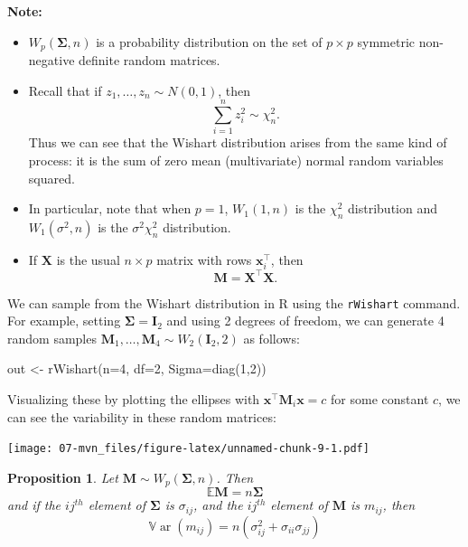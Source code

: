 \documentclass[
]{book}
\newenvironment{Shaded}{\begin{snugshade}}{\end{snugshade}}
\newcommand{\AttributeTok}[1]{\textcolor[rgb]{0.77,0.63,0.00}{#1}}
\newcommand{\DecValTok}[1]{\textcolor[rgb]{0.00,0.00,0.81}{#1}}
\newcommand{\FunctionTok}[1]{\textcolor[rgb]{0.00,0.00,0.00}{#1}}
\newcommand{\NormalTok}[1]{#1}
\newcommand{\OtherTok}[1]{\textcolor[rgb]{0.56,0.35,0.01}{#1}}
\newtheorem{proposition}{Proposition}[chapter]
\theoremstyle{definition}
\theoremstyle{definition}
\theoremstyle{definition}
\theoremstyle{definition}
\theoremstyle{remark}
\begin{document}
\textbf{Note:}

\begin{itemize}
\item
  \(W_p(\boldsymbol{\Sigma},n)\) is a probability distribution on the set of \(p \times p\) symmetric non-negative definite random matrices.
\item
  Recall that if \(z_1, \ldots, z_n \sim N(0, 1)\), then
  \[\sum_{i=1}^n z_i^2 \sim \chi^2_n.\]
  Thus we can see that the Wishart distribution arises from the same kind of process: it is the sum of zero mean (multivariate) normal random variables squared.
\item
  In particular, note that
  when \(p=1\), \(W_1(1,n)\) is the \(\chi_n^2\) distribution and \(W_1(\sigma^2,n)\) is the \(\sigma^2 \chi_n^2\) distribution.
\item
  If \(\mathbf X\) is the usual \(n \times p\) matrix with rows \(\mathbf x_i^\top\), then
  \[\mathbf M= \mathbf X^\top \mathbf X.\]
\end{itemize}

We can sample from the Wishart distribution in R using the \texttt{rWishart} command. For example, setting \(\boldsymbol{\Sigma}=\mathbf I_2\) and using 2 degrees of freedom, we can generate 4 random samples \(\mathbf M_1, \ldots, \mathbf M_4 \sim W_2(\mathbf I_2, 2)\) as follows:

\begin{Shaded}
\begin{Highlighting}[]
\NormalTok{out }\OtherTok{\textless{}{-}} \FunctionTok{rWishart}\NormalTok{(}\AttributeTok{n=}\DecValTok{4}\NormalTok{, }\AttributeTok{df=}\DecValTok{2}\NormalTok{, }\AttributeTok{Sigma=}\FunctionTok{diag}\NormalTok{(}\DecValTok{1}\NormalTok{,}\DecValTok{2}\NormalTok{))}
\end{Highlighting}
\end{Shaded}

Visualizing these by plotting the ellipses with \(\mathbf x^\top \mathbf M_i \mathbf x=c\) for some constant \(c\), we can see the variability in these random matrices:

\texttt{[image: 07-mvn\_files/figure-latex/unnamed-chunk-9-1.pdf]}

\begin{proposition}
\protect\hypertarget{prp:wishartmean}{}{\label{prp:wishartmean} }Let \(\mathbf M\sim W_p(\boldsymbol{\Sigma}, n)\). Then
\[{\mathbb{E}}\mathbf M= n \boldsymbol{\Sigma}\]
and if the \(ij^{th}\) element of \(\boldsymbol{\Sigma}\) is \(\sigma_{ij}\), and the \(ij^{th}\) element of \(\mathbf M\) is \(m_{ij}\), then
\[{\mathbb{V}\operatorname{ar}}(m_{ij}) =  n \left(\sigma_{ij}^2+\sigma_{ii}\sigma_{jj} \right)\]
\end{proposition}
\end{document}
